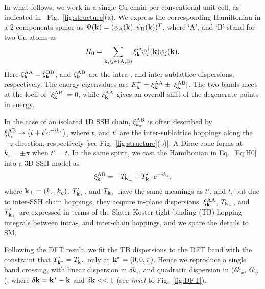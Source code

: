 \documentclass[aps,prl,showpacs,twocolumn,groupedaddress]{revtex4-1}
\begin{document}
In what follows, we work in a single Cu-chain per conventional unit cell, as indicated in ~Fig.~\ref{fig:structure}(a). We express the corresponding Hamiltonian in a 2-components spinor as $\Psi({\bf k}) = (\psi_{\rm A}({\bf k}), \psi_{\rm B}({\bf k}))^{T}$, where `A', and `B' stand for two Cu-atoms as
%
\begin{eqnarray}
H_{0}=\sum_{{\bf k},{ij}\in ({\rm A,B})}\xi^{ij}_{\bf k}\psi^{\dag}_{i}({\bf k})\psi_{j}({\bf k}).
\label{Eq:H0}
\end{eqnarray}
Here $\xi^{\rm AA}_{\bf k}=\xi^{\rm BB}_{\bf k}$, and $\xi^{\rm AB}_{\bf k}$ are the intra-, and inter-sublattice dispersions, respectively. %
The energy eigenvalues are $E_{\bf k}^{\pm}=\xi^{\rm AA}_{\bf k} \pm |\xi^{\rm AB}_{\bf k}|$. The two bands meet at the locii of $|\xi^{\rm AB}_{\bf k}|=0$, while $\xi^{\rm AA}_{\bf k}$ gives an overall shift of the degenerate points in energy.  

In the case of an isolated 1D SSH chain, $\xi^{\rm AB}_{k_z}$ is often described by $\xi^{\rm AB}_{k_z}\rightarrow \left(t+t'e^{-ik_z}\right)$, where $t$, and $t'$ are the inter-sublattice hoppings along the $\pm z$-direction, respectively [see Fig.~\ref{fig:structure}(b)]. A Dirac cone forms at $k_z=\pm\pi$ when {\color{blue}$t'= t$}. In the same spirit, we cast the Hamiltonian in Eq.~\ref{Eq:H0} into a 3D SSH model as 
%
\begin{eqnarray}
\xi^{\rm AB}_{\bf k}&=&T_{{\bf k}_{\perp}}+T'_{{\bf k}_{\perp}}e^{-ik_z},
\label{xiAB}
\end{eqnarray}
%
where ${\bf k}_{\perp}=(k_x,k_y)$. $T'_{{\bf k}_{\perp}}$, and $T_{{\bf k}_{\perp}}$ have the same meanings as $t'$, and $t$, but due to inter-SSH chain hoppings, they acquire in-plane dispersions. $\xi^{\rm AA}_{\bf k}$,  $T_{{\bf k}_{\perp}}$, and $T'_{{\bf k}_{\perp}}$ are expressed in terms of the Slater-Koster tight-binding (TB) hopping integrals between intra-, and inter-chain hoppings, and we spare the details to SM\cite{SM}.

Following the DFT result, we fit the TB dispersions to the DFT band with the constraint that $T^\prime_{{\bf k}^*}=T^{}_{{\bf k}^*}$ only at ${\bf k}^*=(0,0,\pi)$. Hence we reproduce a single band crossing, with linear dispersion in $\delta k_z$, and quadratic dispersion in ($\delta k_x$, $\delta k_y$), where $\delta{\bf k}={\bf k}^*-{\bf k}$ and $\delta{\bf k}<<1$ (see {\it inset} to Fig.~\ref{fig:DFT}). 
\end{document}
